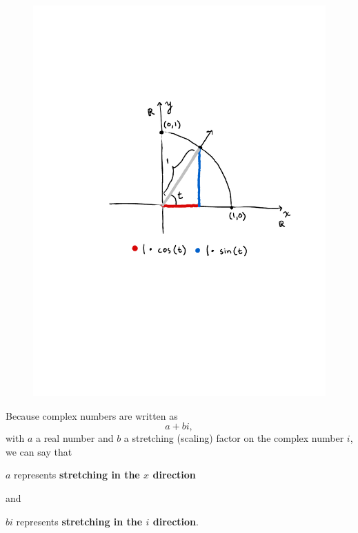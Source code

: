 \documentclass[11pt,serif,aspectratio=169]{beamer}
\begin{document}
	\begin{frame}[c]
		\begin{figure}
			\centering
			\includegraphics[height=0.9\paperheight]{polar-with-trig.pdf}	
		\end{figure}
	\end{frame}
	
	\begin{frame}[c]
		Because complex numbers are written as $$ a + bi,$$ with $a$ a real number and $b$ a stretching (scaling) factor on the complex number $i$, we can say that \begin{center} $a$ represents \textbf{stretching in the $x$ direction}\end{center} and \begin{center} $bi$ represents \textbf{stretching in the $i$ direction}.\end{center}
	\end{frame}
	
\end{document}
